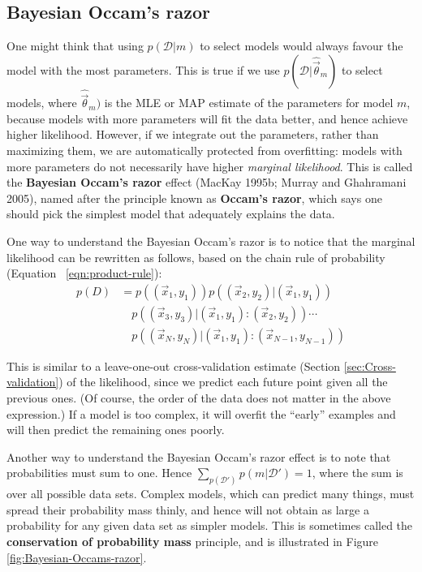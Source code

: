 \subsection{Bayesian Occam's razor}
One might think that using $p(\mathcal{D}|m)$ to select models would always favour the model with the most parameters. This is true if we use $p(\mathcal{D}|\hat{\vec{\theta}}_m)$ to select models, where $\hat{\vec{\theta}}_m)$ is the MLE or MAP estimate of the parameters for model $m$, because models with more parameters will fit the data better, and hence achieve higher likelihood. However, if we integrate out the parameters, rather than maximizing them, we are automatically protected from overfitting: models with more parameters do not necessarily have higher \emph{marginal likelihood}. This is called the \textbf{Bayesian Occam’s razor} effect (MacKay 1995b; Murray and Ghahramani 2005), named after the principle known as \textbf{Occam’s razor}, which says one should pick the simplest model that adequately explains the data.

One way to understand the Bayesian Occam’s razor is to notice that the marginal likelihood can be rewritten as follows, based on the chain rule of probability (Equation ~\ref{eqn:product-rule}):
\begin{equation}\begin{split}
p(D) & =p((\vec{x}_1,y_1))p((\vec{x}_2,y_2)|(\vec{x}_1,y_1)) \\
     & \quad p((\vec{x}_3,y_3)|(\vec{x}_1,y_1):(\vec{x}_2,y_2))\cdots \\
	 & \quad p((\vec{x}_N,y_N)|(\vec{x}_1,y_1):(\vec{x}_{N-1},y_{N-1}))
\end{split}\end{equation}

This is similar to a leave-one-out cross-validation estimate (Section \ref{sec:Cross-validation}) of the likelihood, since we predict each future point given all the previous ones. (Of course, the order of the data does not matter in the above expression.) If a model is too complex, it will overfit the “early” examples and will then predict the remaining ones poorly.

Another way to understand the Bayesian Occam’s razor effect is to note that probabilities must sum to one. Hence $\sum_{p(\mathcal{D}')} p(m|\mathcal{D}')=1$, where the sum is over all possible data sets. Complex models, which can predict many things, must spread their probability mass thinly, and hence will not obtain as large a probability for any given data set as simpler models. This is sometimes called the \textbf{conservation of probability mass} principle, and is illustrated in Figure \ref{fig:Bayesian-Occams-razor}.

